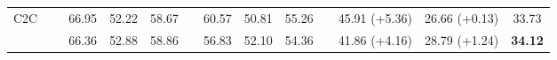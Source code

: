 \begin{table}[t]
{\begin{tabular}{l c ccc c ccc c ccc}
\\
\midrule
C2C~\cite{li2024c2c} && 66.95 & 52.22 & 58.67 && 60.57 & 50.81 & 55.26 && 45.91 (+5.36) & 26.66 (+0.13) & 33.73 \\
\ours{} && 66.36 & 52.88 & 58.86 && 56.83 & 52.10 & 54.36 && 41.86 (+4.16) & 28.79 (+1.24) & \textbf{34.12} \\
\bottomrule
\end{tabular}
\label{tab:iv2_1b_results}
}
\end{table}
